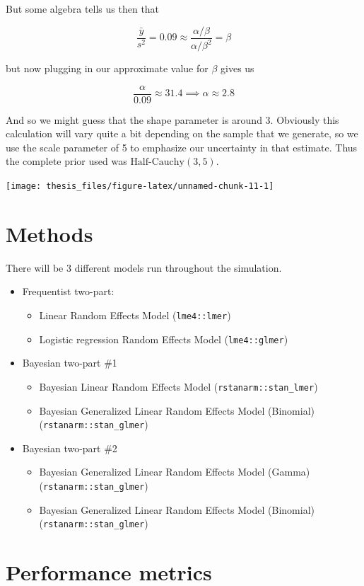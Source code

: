 \documentclass[12pt,twoside]{reedthesis}
\providecommand{\tightlist}{%
  \setlength{\itemsep}{0pt}\setlength{\parskip}{0pt}}
\begin{document}
But some algebra tells us then that

\[
\frac{\bar{y}}{s^2} = 0.09 \approx \frac{\alpha / \beta}{\alpha / \beta^2} = \beta 
\]

but now plugging in our approximate value for \(\beta\) gives us

\[
\frac{\alpha}{0.09} \approx 31.4 \implies \alpha \approx 2.8
\]

And so we might guess that the shape parameter is around 3. Obviously this calculation will vary quite a bit depending on the sample that we generate, so we use the scale parameter of 5 to emphasize our uncertainty in that estimate. Thus the complete prior used was \(\text{Half-Cauchy}(3, 5)\).
\begin{center}\texttt{[image: thesis\_files/figure-latex/unnamed-chunk-11-1]} \end{center}

\hypertarget{methods}{%
\section{Methods}\label{methods}}

There will be 3 different models run throughout the simulation.
\begin{itemize}
\tightlist
\item
  Frequentist two-part:
  \begin{itemize}
  \tightlist
  \item
    Linear Random Effects Model (\texttt{lme4::lmer})
  \item
    Logistic regression Random Effects Model (\texttt{lme4::glmer})
  \end{itemize}
\item
  Bayesian two-part \#1
  \begin{itemize}
  \tightlist
  \item
    Bayesian Linear Random Effects Model (\texttt{rstanarm::stan\_lmer})
  \item
    Bayesian Generalized Linear Random Effects Model (Binomial) (\texttt{rstanarm::stan\_glmer})
  \end{itemize}
\item
  Bayesian two-part \#2
  \begin{itemize}
  \tightlist
  \item
    Bayesian Generalized Linear Random Effects Model (Gamma) (\texttt{rstanarm::stan\_glmer})
  \item
    Bayesian Generalized Linear Random Effects Model (Binomial) (\texttt{rstanarm::stan\_glmer})
  \end{itemize}
\end{itemize}
\hypertarget{metrics}{%
\section{Performance metrics}\label{metrics}}
\end{document}
